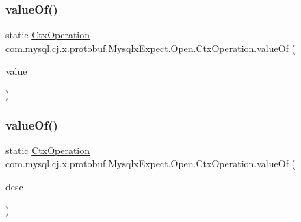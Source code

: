 \subsubsection{\texorpdfstring{value\+Of()}{valueOf()}\hspace{0.1cm}{\footnotesize\ttfamily [1/2]}}
{\footnotesize\ttfamily static \mbox{\hyperlink{enumcom_1_1mysql_1_1cj_1_1x_1_1protobuf_1_1_mysqlx_expect_1_1_open_1_1_ctx_operation}{Ctx\+Operation}} com.\+mysql.\+cj.\+x.\+protobuf.\+Mysqlx\+Expect.\+Open.\+Ctx\+Operation.\+value\+Of (\begin{DoxyParamCaption}\item[{int}]{value }\end{DoxyParamCaption})\hspace{0.3cm}{\ttfamily [static]}}

\mbox{\label{enumcom_1_1mysql_1_1cj_1_1x_1_1protobuf_1_1_mysqlx_expect_1_1_open_1_1_ctx_operation_a560a5034845ccf860f35ff5e51baeffa}} 
\subsubsection{\texorpdfstring{value\+Of()}{valueOf()}\hspace{0.1cm}{\footnotesize\ttfamily [2/2]}}
{\footnotesize\ttfamily static \mbox{\hyperlink{enumcom_1_1mysql_1_1cj_1_1x_1_1protobuf_1_1_mysqlx_expect_1_1_open_1_1_ctx_operation}{Ctx\+Operation}} com.\+mysql.\+cj.\+x.\+protobuf.\+Mysqlx\+Expect.\+Open.\+Ctx\+Operation.\+value\+Of (\begin{DoxyParamCaption}\item[{com.\+google.\+protobuf.\+Descriptors.\+Enum\+Value\+Descriptor}]{desc }\end{DoxyParamCaption})\hspace{0.3cm}{\ttfamily [static]}}



